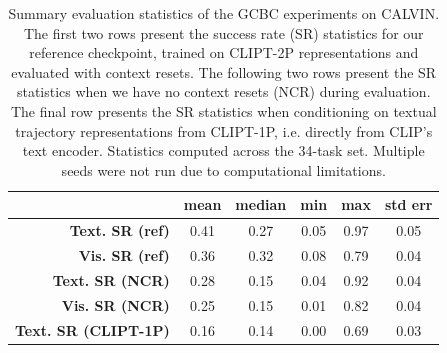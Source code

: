 \documentclass[../main.tex]{subfiles}
\begin{document}
\begin{table}[tb]
	\centering
	\caption[GCBC success rate on the CALVIN dataset]{Summary evaluation statistics of the GCBC
		experiments on CALVIN. The first two rows present the success rate (SR) statistics for our
		reference checkpoint, trained on CLIPT-2P representations and evaluated with context resets. The
		following two rows present the SR statistics when we have no context resets (NCR) during
		evaluation. The final row presents the SR statistics when conditioning on textual trajectory
		representations from CLIPT-1P, i.e. directly from CLIP's text encoder. Statistics computed across the 34-task set. Multiple seeds were not run due to computational limitations.}
	\label{tab:gcbc-calvin-res}
	\begin{tabular}{@{}rccccc@{}}
		\toprule[1.5pt]
		\textbf{}                    & \textbf{mean}    & \textbf{median} & \textbf{min} & \textbf{max}
		                             & \textbf{std err}                                                        \\ \midrule
		\textbf{Text. SR (ref)}      & 0.41             & 0.27            & 0.05         & 0.97         & 0.05 \\
		\textbf{Vis. SR (ref)}       & 0.36             & 0.32            & 0.08         & 0.79
		                             & 0.04
		\\ \midrule[0.05pt]
		\textbf{Text. SR (NCR)}      & 0.28             & 0.15            & 0.04         & 0.92         & 0.04 \\
		\textbf{Vis. SR (NCR)}       & 0.25             & 0.15            & 0.01         & 0.82
		                             & 0.04                                                                    \\ \midrule[0.05pt]
		\textbf{Text. SR (CLIPT-1P)} & 0.16             & 0.14            & 0.00         & 0.69
		                             & 0.03                                                                    \\ \bottomrule[1.5pt]
	\end{tabular}
\end{table}
\end{document}

